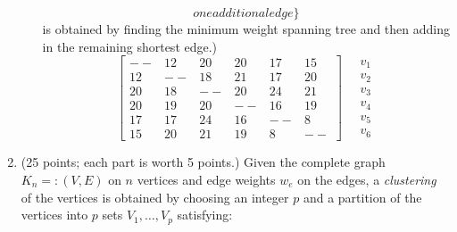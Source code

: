 \begin{enumerate}
\begin{enumerate}
\begin{displaymath}
{                                        one additional edge}\}
              \end{displaymath}
              is obtained by finding the minimum weight spanning tree and then
              adding in the remaining shortest edge.)
\begin{displaymath}
   \left[ \begin{array}{rrrrrr} -- & 12 & 20 & 20 & 17 & 15 \\
                                12 & -- & 18 & 21 & 17 & 20 \\
                                20 & 18 & -- & 20 & 24 & 21 \\
                                20 & 19 & 20 & -- & 16 & 19 \\
                                17 & 17 & 24 & 16 & -- &  8 \\
                                15 & 20 & 21 & 19 &  8 & -- 
           \end{array}  \right]  \quad
    \left. \begin{array}{c} v_1 \\ v_2 \\ v_3 \\ v_4 \\ v_5 \\ v_6 \end{array}
             \right.
\end{displaymath}
          \end{enumerate}
   \item (25 points; each part is worth 5 points.)
Given the complete graph $K_n=:(V,E)$ on $n$ vertices
and edge weights $w_e$ on the edges, a {\em clustering}
of the vertices is obtained by choosing an integer $p$
and a partition of the vertices into $p$ sets $V_1,\ldots,V_p$ satisfying:

\end{enumerate}

